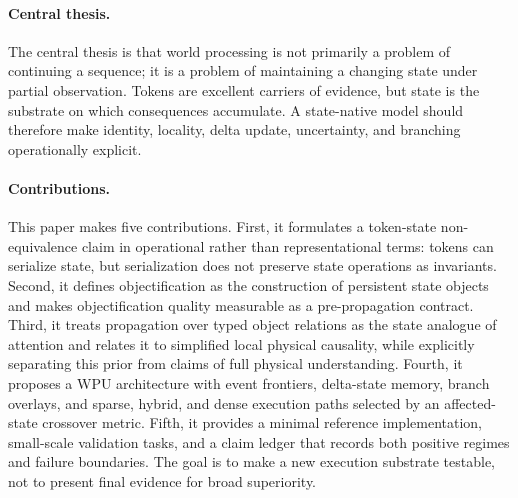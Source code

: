 \documentclass[11pt]{article}
\begin{document}
\paragraph{Central thesis.}
The central thesis is that world processing is not primarily a problem of
continuing a sequence; it is a problem of maintaining a changing state under
partial observation. Tokens are excellent carriers of evidence, but state is the
substrate on which consequences accumulate. A state-native model should
therefore make identity, locality, delta update, uncertainty, and branching
operationally explicit.

\paragraph{Contributions.}
This paper makes five contributions. First, it formulates a token-state
non-equivalence claim in operational rather than representational terms: tokens
can serialize state, but serialization does not preserve state operations as
invariants. Second, it defines objectification as the construction of persistent
state objects and makes objectification quality measurable as a pre-propagation
contract. Third, it treats propagation over typed object relations as the state
analogue of attention and relates it to simplified local physical causality,
while explicitly separating this prior from claims of full physical
understanding. Fourth, it proposes a WPU architecture with event frontiers,
delta-state memory, branch overlays, and sparse, hybrid, and dense execution
paths selected by an affected-state crossover metric. Fifth, it provides a
minimal reference implementation, small-scale validation tasks, and a claim
ledger that records both positive regimes and failure boundaries. The goal is
to make a new execution substrate testable, not to present final evidence for
broad superiority.
\end{document}
